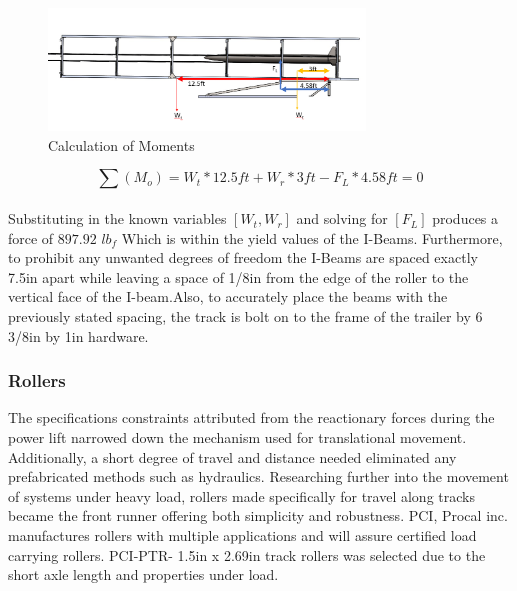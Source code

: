 \documentclass[10pt,a4paper]{article}
\begin{document}
\begin{figure}
\centering
\includegraphics[width=0.75\textwidth]{./figs/moment_cal.png}
\caption{Calculation of Moments}
\label{fig:Calculation of Moments}
\end{figure}

\begin{equation}
\sum(M_{o}) = W_{t}*12.5ft+ W_{r}*3ft -F_{L}*4.58ft=0 
\end{equation} 
\label{eq:1}\\
Substituting in the known variables $[W_t , W_r]$  and solving for $[F_L]$ produces a force of $897.92$ $lb_f$
Which is within the yield values of the I-Beams. Furthermore, to prohibit any unwanted degrees of freedom the I-Beams are spaced exactly 7.5in  apart while leaving a space of 1/8in from the edge of the roller to the vertical face of the I-beam.Also, to accurately place the beams with the previously stated spacing, the track is bolt on to the frame of the trailer by 6 3/8in by 1in hardware.


\subsubsection{Rollers}
 The specifications constraints attributed from the reactionary forces during the power lift narrowed down the mechanism used for translational movement. Additionally, a short degree of travel and distance needed eliminated any prefabricated methods such as hydraulics. Researching further into the movement of systems under heavy load, rollers made specifically for travel along tracks became the front runner offering both simplicity and robustness. PCI, Procal inc. manufactures rollers with multiple applications and will assure certified load carrying rollers. PCI-PTR- 1.5in x 2.69in track rollers was selected due to the short axle length and properties under load. 
\end{document}
